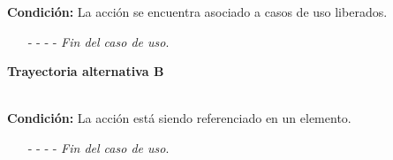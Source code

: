 \noindent \textbf{Condición:} La acción se encuentra asociado a casos de uso liberados.
\begin{enumerate}
	\UCpaso[\UCsist] Oculta el botón \eliminar de la acción que esta asociado a casos de uso liberados.
	\item[- -] - - {\em {Fin del caso de uso}}.
\end{enumerate}
\hypertarget{CU11-1-3:TAB}{\textbf{Trayectoria alternativa B}}\\
\noindent \textbf{Condición:} La acción está siendo referenciado en un elemento.
\begin{enumerate}
	\UCpaso[\UCsist] Muestra la pantalla  o  con el mensaje  mostrando una lista de elementos que están referenciando a la acción.
	\item[- -] - - {\em {Fin del caso de uso}}.%
\end{enumerate}
	

